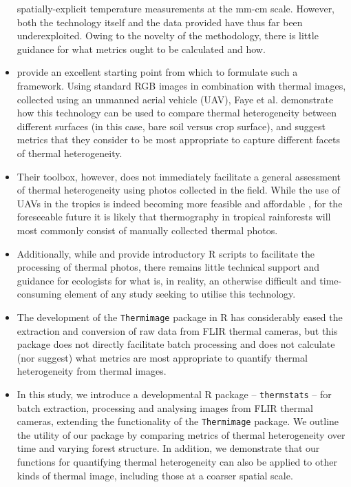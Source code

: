 \documentclass[12pt,a4paper,]{report}
\theoremstyle{definition}
\theoremstyle{definition}
\theoremstyle{definition}
\theoremstyle{remark}
\begin{document}
\begin{itemize}
  spatially-explicit temperature measurements at the mm-cm scale.
  However, both the technology itself and the data provided have thus
  far been underexploited. Owing to the novelty of the methodology,
  there is little guidance for what metrics ought to be calculated and
  how.
\item
  \citet{faye_toolbox_2016} provide an excellent starting point from
  which to formulate such a framework. Using standard RGB images in
  combination with thermal images, collected using an unmanned aerial
  vehicle (UAV), Faye et al. demonstrate how this technology can be used
  to compare thermal heterogeneity between different surfaces (in this
  case, bare soil versus crop surface), and suggest metrics that they
  consider to be most appropriate to capture different facets of thermal
  heterogeneity.
\item
  Their toolbox, however, does not immediately facilitate a general
  assessment of thermal heterogeneity using photos collected in the
  field. While the use of UAVs in the tropics is indeed becoming more
  feasible and affordable \citep{sanchez-azofeifa_twenty-first_2017},
  for the foreseeable future it is likely that thermography in tropical
  rainforests will most commonly consist of manually collected thermal
  photos.
\item
  Additionally, while \citet{faye_toolbox_2016} and
  \citet{scheffers_extreme_2017} provide introductory R scripts to
  facilitate the processing of thermal photos, there remains little
  technical support and guidance for ecologists for what is, in reality,
  an otherwise difficult and time-consuming element of any study seeking
  to utilise this technology.
\item
  The development of the \texttt{Thermimage} package in R has
  considerably eased the extraction and conversion of raw data from FLIR
  thermal cameras, but this package does not directly facilitate batch
  processing and does not calculate (nor suggest) what metrics are most
  appropriate to quantify thermal heterogeneity from thermal images.
\item
  In this study, we introduce a developmental R package --
  \texttt{thermstats} -- for batch extraction, processing and analysing
  images from FLIR thermal cameras, extending the functionality of the
  \texttt{Thermimage} package. We outline the utility of our package by
  comparing metrics of thermal heterogeneity over time and varying
  forest structure. In addition, we demonstrate that our functions for
  quantifying thermal heterogeneity can also be applied to other kinds
  of thermal image, including those at a coarser spatial scale.
\end{itemize}
\end{document}
